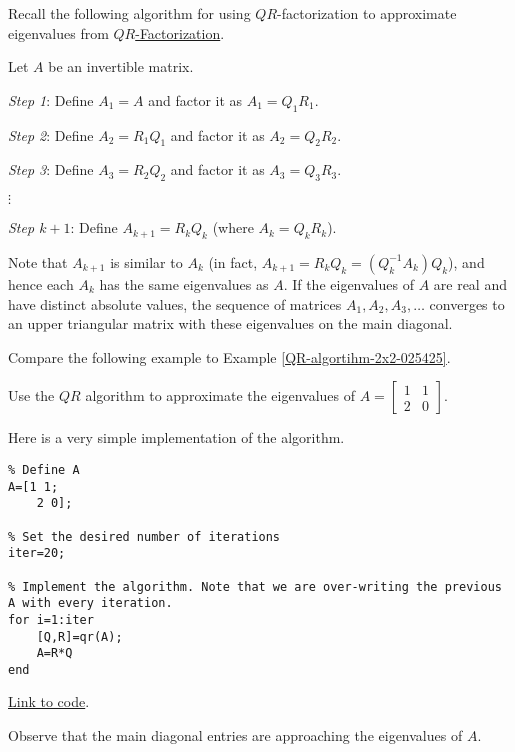 \documentclass{ximera}
\begin{document}
Recall the following algorithm for using $QR$-factorization to approximate eigenvalues from \href{https://ximera.osu.edu/linearalgebradzv3/LinearAlgebraInteractiveIntro/RTH-0040/main}{$QR$-Factorization}.

\begin{algorithm}[\ref{alg:qrEig}]
Let $A$ be an invertible matrix.

\emph{Step 1}: Define $A_{1} = A$ and factor it as $A_{1} = Q_{1}R_{1}$.

\emph{Step 2}: Define $A_{2} = R_{1}Q_{1}$ and factor it as $A_{2} = Q_{2}R_{2}$.

\emph{Step 3}: Define $A_{3} = R_{2}Q_{2}$ and factor it as $A_{3} = Q_{3}R_{3}$.

 $\vdots$
 
\emph{Step $k+1$}: Define $A_{k + 1} = R_{k}Q_{k}$ (where $A_{k} = Q_{k}R_{k}$). 

Note that $A_{k + 1}$ is similar to $A_{k}$ (in fact, $A_{k+1} = R_{k}Q_{k} = (Q_{k}^{-1}A_{k})Q_{k}$), and hence each $A_{k}$ has the same eigenvalues as $A$. If the eigenvalues of $A$ are real and have distinct absolute values, the sequence of matrices $A_{1}, A_{2}, A_{3}, \dots$ converges to an upper triangular matrix with these eigenvalues on the main diagonal. 
\end{algorithm}

Compare the following example to Example \ref{QR-algortihm-2x2-025425}.

\begin{example}\label{ex:qrEig}
Use the $QR$ algorithm to approximate the eigenvalues of $A=\begin{bmatrix}1 & 1\\2 & 0\end{bmatrix}$.  

\begin{explanation}
    Here is a very simple implementation of the algorithm.  

    \begin{verbatim}
% Define A
A=[1 1;
    2 0];

% Set the desired number of iterations
iter=20;  

% Implement the algorithm. Note that we are over-writing the previous A with every iteration.
for i=1:iter
    [Q,R]=qr(A);
    A=R*Q
end    
    \end{verbatim}

\href{https://sagecell.sagemath.org/?z=eJwtjbEKwkAQRPuF_YdpAioWuZSGKw78gcQypFBuD7fwDjfn_5tDp3oMvJkOV0maBYEp-MXBjUzYM6Bfd2TqcJOK-hRE2dQkIn9eDzGUBK1i96olb0yN_dCPQLNSMah3l9b-BpfpPK_-bYdw_F8EP58mJsnxCzFCIso=&lang=octave&interacts=eJyLjgUAARUAuQ==}{Link to code}.   

Observe that the main diagonal entries are approaching the eigenvalues of $A$.
\end{explanation}
    
\end{example}
\end{document}
